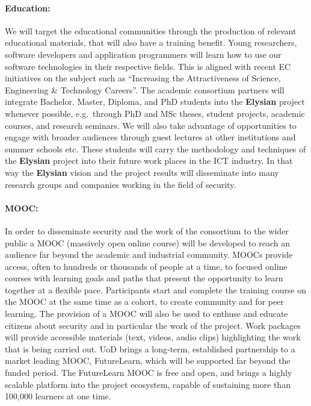 \documentclass[a4paper,11pt]{article}
\newcommand{\project}[1]{\textbf{#1}\xspace}
\newcommand{\SECURITY}{\project{Elysian}}
\newcommand{\TheProject}{\SECURITY}
\begin{document}
\paragraph{Education:} We will target 
the educational communities through the production of relevant educational materials, that will
also have a training benefit. Young researchers, software
 developers and application programmers will learn how to
 use our software technologies in their
 respective fields. This is aligned with recent EC
 initiatives on the subject such as ``Increasing the Attractiveness
 of Science, Engineering \& Technology Careers''.
 The academic consortium partners will integrate Bachelor,
 Master, Diploma, and PhD students into the \TheProject{}
 project whenever possible, e.g.~through PhD and MSc theses, student
 projects, academic courses, and research seminars. 
 We will also take advantage of opportunities to engage with broader
 audiences through guest lectures at other institutions and summer schools etc.
 These students will
 carry the methodology and techniques of the \TheProject{}
 project into their future work places in the ICT industry.
 In that way the \TheProject{} vision and the project
 results will disseminate into many research groups and
 companies working in the field of security. 
 \paragraph{MOOC:}In order to disseminate security and the work of the consortium to the wider public a MOOC (massively open online course) will be developed to reach an audience far beyond the academic and industrial community.  MOOCs provide access, often to hundreds or thousands of people at a time, to focused online courses with learning goals and paths that present the opportunity to learn together at a flexible pace. Participants start and complete the training course on the MOOC at the same time as a cohort, to create community and for peer learning. The provision of a MOOC will also be
used to enthuse and educate citizens about security and in particular the work of the project.  Work packages will provide accessible materials (text, videos, audio clips) highlighting the work that is being carried out. UoD brings a long‐term, established partnership to a market leading MOOC, FutureLearn, which will be supported far beyond the funded period. The FutureLearn MOOC is free and open, and brings a highly scalable platform into the project ecosystem, capable of sustaining more than 100,000 learners at one time.
\end{document}
